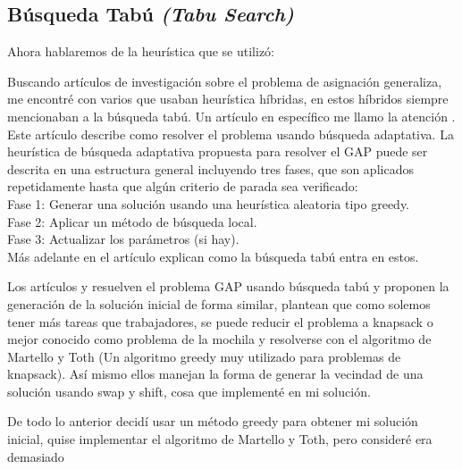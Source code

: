 \documentclass{article}
\begin{document}
\subsection{Búsqueda Tabú \emph{(Tabu Search)}}
Ahora hablaremos de la heurística que se utilizó:

Buscando artículos de investigación sobre el problema de asignación generaliza, me encontré con varios que usaban heurística híbridas, en estos híbridos siempre mencionaban a la búsqueda tabú. Un artículo en específico me llamo la atención \cite{gap}. Este artículo describe como resolver el problema usando búsqueda adaptativa. La heurística de búsqueda adaptativa propuesta para resolver el GAP puede ser descrita en una estructura general incluyendo tres fases, que son aplicados repetidamente hasta que algún criterio de parada sea verificado:\\
Fase 1: Generar una solución usando una heurística aleatoria tipo greedy.\\
Fase 2: Aplicar un método de búsqueda local.\\
Fase 3: Actualizar los parámetros (si hay).\\
Más adelante en el artículo explican como la búsqueda tabú entra en estos.

Los artículos \cite{tsgap} y \cite{tshgap} resuelven el problema GAP usando búsqueda tabú y proponen la generación de la solución inicial de forma similar, plantean que como solemos tener más tareas que trabajadores, se puede reducir el problema a knapsack o mejor conocido como problema de la mochila y resolverse con el algoritmo de Martello y Toth (Un algoritmo greedy muy utilizado para problemas de knapsack). Así mismo ellos manejan la forma de generar la vecindad de una solución usando swap y shift, cosa que implementé en mi solución.

De todo lo anterior decidí usar un método greedy para obtener mi solución inicial, quise implementar el algoritmo de Martello y Toth, pero consideré era demasiado 
\end{document}
